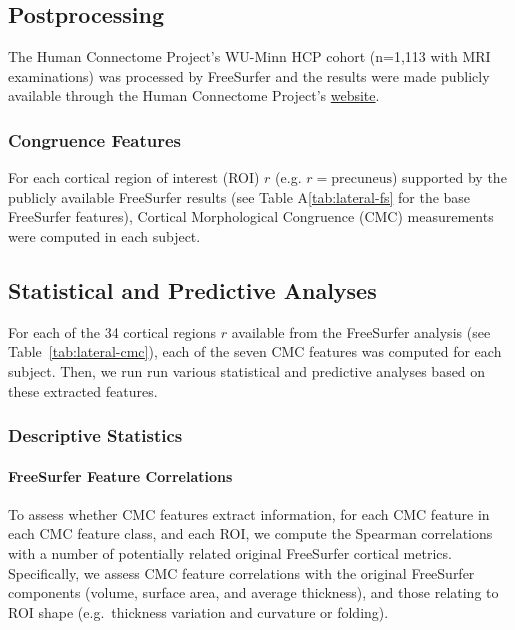 \documentclass{article}
\begin{document}
\subsection{Postprocessing}
\label{sec:postprocessing}

The Human Connectome Project's WU-Minn HCP cohort (n=1,113 with MRI
examinations) was processed by FreeSurfer \citep{fischlFreeSurfer2012} and
the results were made publicly available through the Human Connectome
Project's \href{%
https://www.humanconnectome.org/study/hcp-young-adult/document/1200-subjects-data-release}{website}.


\subsubsection{Congruence Features}
\label{sec:cmc-features}

For each cortical region of interest (ROI) \(r\) (e.g.
\(r=\text{precuneus}\)) supported by the publicly available FreeSurfer
results (see Table A\ref{tab:lateral-fs} for the base FreeSurfer features),
Cortical Morphological Congruence (CMC) measurements were computed in each
subject.



\subsection{Statistical and Predictive Analyses}

For each of the 34 cortical regions \(r\) available from the FreeSurfer
analysis (see Table~\ref{tab:lateral-cmc}), each of the seven CMC features was
computed for each subject. Then, we run run various statistical and
predictive analyses based on these extracted features.

\subsubsection{Descriptive Statistics}


\paragraph{FreeSurfer Feature Correlations} To assess whether CMC features
extract  information, for each CMC feature in each CMC
feature class, and each ROI, we compute the Spearman correlations with a
number of potentially related original FreeSurfer cortical metrics.
Specifically, we assess CMC feature correlations with the original FreeSurfer
components (volume, surface area, and average thickness), and those relating
to ROI shape (e.g.\ thickness variation and curvature or folding).
\end{document}
